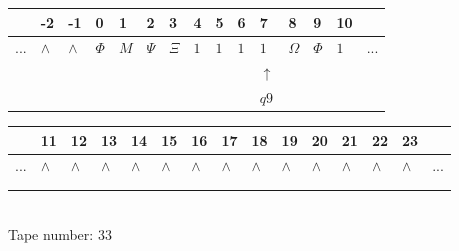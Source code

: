 \documentclass[11pt]{article}
\begin{document}
\begin{table}[H]
\centering
\begin{tabular}{lllllllllllllll}
 & -2 & -1 & 0 & 1 & 2 & 3 & 4 & 5 & 6 & 7 & 8 & 9 & 10 & \\
\hline
$...$ & \multicolumn{1}{|l|}{$\wedge$} & \multicolumn{1}{|l|}{$\wedge$} & \multicolumn{1}{|l|}{$\Phi$} & \multicolumn{1}{|l|}{$M$} & \multicolumn{1}{|l|}{$\Psi$} & \multicolumn{1}{|l|}{$\Xi$} & \multicolumn{1}{|l|}{$1$} & \multicolumn{1}{|l|}{$1$} & \multicolumn{1}{|l|}{$1$} & \multicolumn{1}{|l|}{$1$} & \multicolumn{1}{|l|}{$\Omega$} & \multicolumn{1}{|l|}{$\Phi$} & \multicolumn{1}{|l|}{$1$} & $...$\\
\hline
&  &  &  &  &  &  &  &  &  & $\uparrow$ &  &  &  &  \\
&  &  &  &  &  &  &  &  &  & $ q9 $ &  &  &  &  \\
\end{tabular}
\begin{tabular}{lllllllllllllll}
 & 11 & 12 & 13 & 14 & 15 & 16 & 17 & 18 & 19 & 20 & 21 & 22 & 23 & \\
\hline
$...$ & \multicolumn{1}{|l|}{$\wedge$} & \multicolumn{1}{|l|}{$\wedge$} & \multicolumn{1}{|l|}{$\wedge$} & \multicolumn{1}{|l|}{$\wedge$} & \multicolumn{1}{|l|}{$\wedge$} & \multicolumn{1}{|l|}{$\wedge$} & \multicolumn{1}{|l|}{$\wedge$} & \multicolumn{1}{|l|}{$\wedge$} & \multicolumn{1}{|l|}{$\wedge$} & \multicolumn{1}{|l|}{$\wedge$} & \multicolumn{1}{|l|}{$\wedge$} & \multicolumn{1}{|l|}{$\wedge$} & \multicolumn{1}{|l|}{$\wedge$} & $...$\\
\hline
&  &  &  &  &  &  &  &  &  &  &  &  &  &  \\
&  &  &  &  &  &  &  &  &  &  &  &  &  &  \\
\end{tabular}
\\
Tape number: 33
\noindent\makebox[\linewidth]{\hdashrule{\textwidth}{1pt}{1pt}}\end{table}
\end{document}
